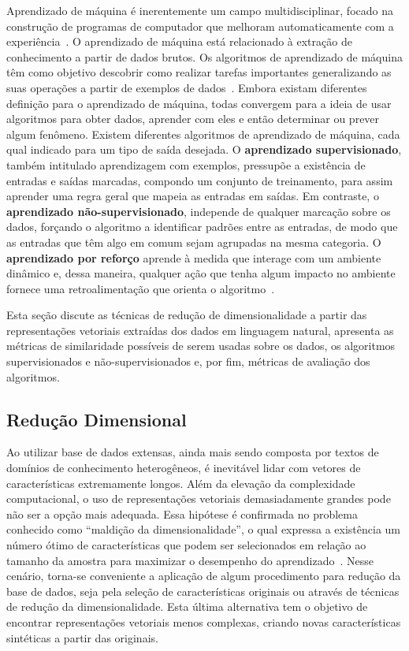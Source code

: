 \documentclass{SBCbookchapter}
\begin{document}
Aprendizado de máquina é inerentemente um campo multidisciplinar, focado na construção de programas de computador que melhoram automaticamente com a experiência~\cite{boutaba-jisa-2018}. O aprendizado de máquina está relacionado à extração de conhecimento a partir de dados brutos. Os algoritmos de aprendizado de máquina têm como objetivo descobrir como realizar tarefas importantes generalizando as suas operações a partir de exemplos de dados~\cite{domingos2012few}. Embora existam diferentes definição para o aprendizado de máquina, todas convergem para a ideia de usar algoritmos para obter dados, aprender com eles e então determinar ou prever algum fenômeno. 
Existem diferentes algoritmos de aprendizado de máquina, cada qual indicado para um tipo de saída desejada. O \textbf{aprendizado supervisionado}, também intitulado aprendizagem com exemplos, pressupõe a existência de entradas e saídas marcadas, compondo um conjunto de treinamento, para assim aprender uma regra geral que mapeia as entradas em saídas. Em contraste, o \textbf{aprendizado não-supervisionado}, independe de qualquer marcação sobre os dados, forçando o algoritmo a identificar padrões entre as entradas, de modo que as entradas que têm algo em comum sejam agrupadas na mesma categoria. O \textbf{aprendizado por reforço} aprende à medida que interage com um ambiente dinâmico e, dessa maneira, qualquer ação que tenha algum impacto no ambiente fornece uma retroalimentação que orienta o algoritmo~\cite{ayodele2010types}.

Esta seção discute as técnicas de redução de dimensionalidade a partir das representações vetoriais extraídas dos dados em linguagem natural, apresenta as métricas de similaridade possíveis de serem usadas sobre os dados, os algoritmos supervisionados e não-supervisionados e, por fim,  métricas de avaliação dos algoritmos.%


\subsection{Redução Dimensional}
\label{sec:redução}

Ao utilizar base de dados extensas, ainda mais sendo composta por textos de domínios de conhecimento heterogêneos, é inevitável lidar com vetores de características extremamente longos. Além da elevação da complexidade computacional, o uso de representações vetoriais demasiadamente grandes pode não ser a opção mais adequada. Essa hipótese é confirmada no problema conhecido como ``maldição da dimensionalidade'', o qual expressa a existência um número ótimo de características que podem ser selecionados em relação ao tamanho da amostra para maximizar o desempenho do aprendizado~\cite{zhai2014emerging}.
Nesse cenário, torna-se conveniente a aplicação de algum procedimento para redução da base de dados, seja pela seleção de características originais ou através de técnicas de redução da dimensionalidade. Esta última alternativa tem o objetivo de encontrar representações vetoriais menos complexas, criando novas características sintéticas a partir das originais.
\end{document}

